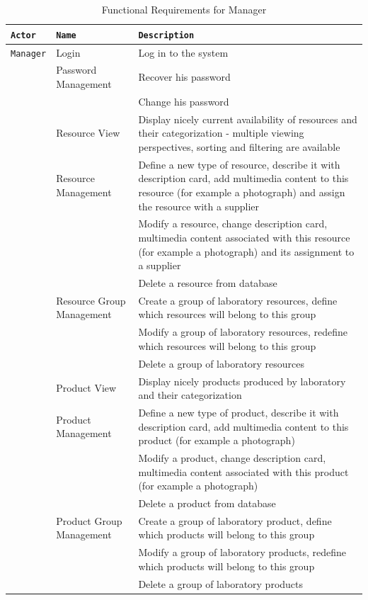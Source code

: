 \documentclass[a4paper,11pt,twoside]{report}
\theoremstyle{definition}
\begin{document}
\begin{longtable}{|p{3cm}|p{3cm}|p{10cm}|}
\caption[Functional Requirements for Manager]{Functional Requirements for Manager}
\label{functional requirements manager}
\tabularnewline

\hline
\texttt{Actor} & \texttt{Name} & \texttt{Description} \\ \hline
\texttt{Manager} & Login & Log in to the system\\  \cline{2-3}
\texttt{} & Password Management & Recover his password\\  \cline{3-3}
\texttt{} & & Change his password\\ \cline{2-3}

\texttt{} & Resource View & Display nicely current availability of resources and their categorization - multiple viewing perspectives, sorting and filtering are available\\ \cline{2-3}
\texttt{} & Resource Management & Define a new type of resource, describe it with description card, add multimedia content to this resource (for example a photograph) and assign the resource with a supplier\\ \cline{3-3}
\texttt{} & & Modify a resource, change description card, multimedia content associated with this resource (for example a photograph) and its assignment to a supplier\\ \cline{3-3}
\texttt{} & & Delete a resource from database\\ \cline{2-3}

\texttt{} & Resource Group Management & Create a group of laboratory resources, define which resources will belong to this group\\ \cline{3-3}
\texttt{} & & Modify a group of laboratory resources, redefine which resources will belong to this group\\ \cline{3-3}
\texttt{} & & Delete a group of laboratory resources\\ \cline{2-3}
\texttt{} & Product View & Display nicely products produced by laboratory and their categorization\\ \cline{2-3}
\texttt{} & Product Management & Define a new type of product, describe it with description card, add multimedia content to this product (for example a photograph)\\ \cline{3-3}
\texttt{} & & Modify a product, change description card, multimedia content associated with this product (for example a photograph)\\ \cline{3-3}
\texttt{} & & Delete a product from database\\ \cline{2-3}
\texttt{} & Product Group Management & Create a group of laboratory product, define which products will belong to this group\\ \cline{3-3}
\texttt{} & & Modify a group of laboratory products, redefine which products will belong to this group\\ \cline{3-3}
\texttt{} & & Delete a group of laboratory products\\ \cline{2-3}


\end{longtable}
\end{document}
